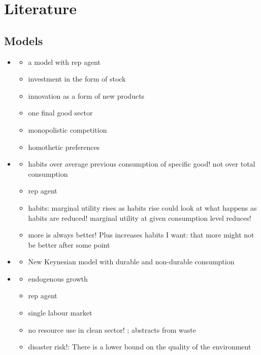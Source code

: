 \section{Literature}

\subsection{Models}
\begin{itemize}
\item \cite{Bilbiie2012EndogenousCycles}
\begin{itemize}
\item a model with rep agent
\item investment in the form of stock 
\item innovation as a form of new products
\item one final good sector
\item monopolistic competition
\item homothetic preferences
\end{itemize}
\item \cite{Ravn2006DeepHabits}
\begin{itemize}
 \item habits over average previous consumption of specific good! not over total consumption
 \item rep agent 
 \item habits: marginal utility rises as habits rise \ar could look at what happens as habits are reduced! \ar marginal utility at given consumption level reduces!
 \item more is always better! Plus increases habits \ar I want: that more might not be better after some point
\end{itemize}
\item \cite{McKay2021LumpyPolicy}
\begin{itemize}
\item New Keynesian model with durable and non-durable consumption 
\end{itemize}
\item \cite{Acemoglu2012TheChange}
\begin{itemize}
\item endogenous growth
\item rep agent
\item single labour market
\item no resource use in clean sector! ; abstracts from waste
\item disaster risk!: There is a lower bound on the quality of the environment 

\end{itemize}
\end{itemize}
